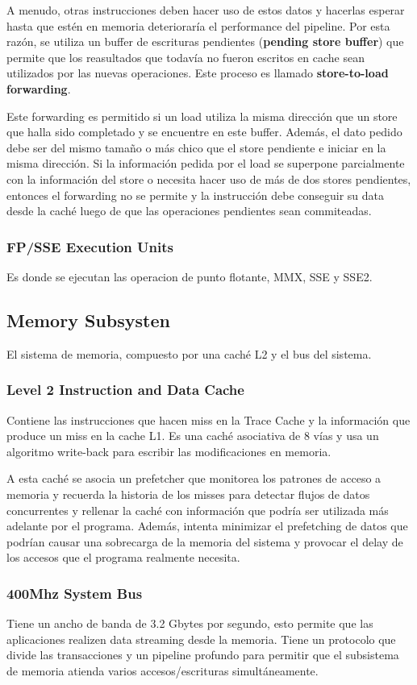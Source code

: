 A menudo, otras instrucciones deben hacer uso de estos datos y hacerlas esperar hasta que estén en memoria deterioraría el performance del pipeline. Por esta razón, se utiliza un buffer de escrituras pendientes (\textbf{pending store buffer}) que permite que los reasultados que todavía no fueron escritos en cache sean utilizados por las nuevas operaciones. Este proceso es llamado \textbf{store-to-load forwarding}.

Este forwarding es permitido si un load utiliza la misma dirección que un store que halla sido completado y se encuentre en este buffer. Además, el dato pedido debe ser del mismo tamaño o más chico que el store pendiente e iniciar en la misma dirección. Si la información pedida por el load se superpone parcialmente con la información del store o necesita hacer uso de más de dos stores pendientes, entonces el forwarding no se permite y  la instrucción debe conseguir su data desde la caché luego de que las operaciones pendientes sean commiteadas.

\subsubsection*{FP/SSE Execution Units}
Es donde se ejecutan las operacion de punto flotante, MMX, SSE y SSE2.
\subsection{Memory Subsysten}
El sistema de memoria, compuesto por una caché L2 y el bus del sistema.

\subsubsection*{Level 2 Instruction and Data Cache}
Contiene las instrucciones que hacen miss en la Trace Cache y la información que produce un miss en la cache L1. Es una caché asociativa de 8 vías y usa un algoritmo write-back para escribir las modificaciones en memoria.

A esta caché se asocia un prefetcher que monitorea los patrones de acceso a memoria y recuerda la historia de los misses para detectar flujos de datos concurrentes y rellenar la caché con información que podría ser utilizada más adelante por el programa. Además, intenta minimizar el prefetching de datos que podrían causar una sobrecarga de la memoria del sistema y provocar el delay de los accesos que el programa realmente necesita.

\subsubsection*{400Mhz System Bus}
Tiene un ancho de banda de 3.2 Gbytes por segundo, esto permite que las aplicaciones realizen data streaming desde la memoria. Tiene un protocolo que divide las transacciones y un pipeline profundo para permitir que el subsistema de memoria atienda varios accesos/escrituras simultáneamente. 

